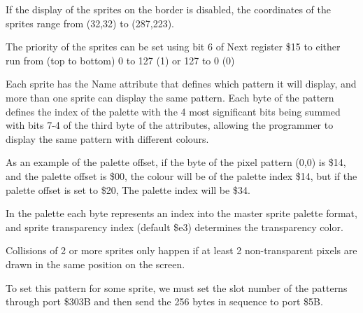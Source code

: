 If the display of the sprites on the border is disabled, the
coordinates of the sprites range from (32,32) to (287,223).

The priority of the sprites can be set using bit 6 of Next register
\$15 to either run from (top to bottom) 0 to 127 (1) or 127 to 0 (0)

Each sprite has the Name attribute that defines which pattern it will
display, and more than one sprite can display the same pattern. Each
byte of the pattern defines the index of the palette with the 4 most
significant bits being summed with bits 7-4 of the third byte of the
attributes, allowing the programmer to display the same pattern with
different colours.

As an example of the palette offset, if the byte of the pixel pattern
(0,0) is \$14, and the palette offset is \$00, the colour will be of
the palette index \$14, but if the palette offset is set to \$20, The
palette index will be \$34.

In the palette each byte represents an index into the master sprite
palette format, and sprite transparency index (default \$e3)
determines the transparency color.

Collisions of 2 or more sprites only happen if at least 2
non-transparent pixels are drawn in the same position on the screen.

To set this pattern for some sprite, we must set the slot number of
the patterns through port \$303B and then send the 256 bytes in
sequence to port \$5B.
